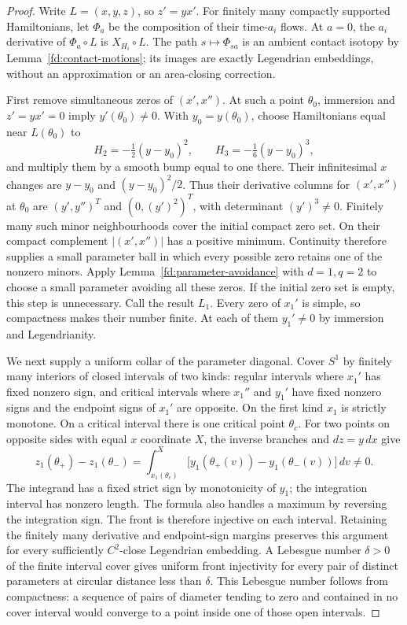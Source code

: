 \begin{proof}\leanok{}
Write $L=(x,y,z)$, so $z'=yx'$. For finitely many compactly supported
Hamiltonians, let $\Phi_a$ be the composition of their time-$a_i$ flows.
At $a=0$, the $a_i$ derivative of $\Phi_a\circ L$ is $X_{H_i}\circ L$.
The path $s\mapsto\Phi_{sa}$ is an ambient contact isotopy by
Lemma~\ref{fd:contact-motions}; its images are exactly Legendrian
embeddings, without an approximation or an area-closing correction.

First remove simultaneous zeros of $(x',x'')$. At such a point
$\theta_0$, immersion and $z'=yx'=0$ imply $y'(\theta_0)\ne0$.
With $y_0=y(\theta_0)$, choose Hamiltonians equal near $L(\theta_0)$ to
\begin{equation}
 H_2=-\tfrac12(y-y_0)^2,\qquad H_3=-\tfrac16(y-y_0)^3,
\end{equation}
and multiply them by a smooth bump equal to one there. Their
infinitesimal $x$ changes are $y-y_0$ and $(y-y_0)^2/2$.
Thus their derivative columns for $(x',x'')$ at $\theta_0$ are
$(y',y'')^T$ and $(0,(y')^2)^T$, with determinant $(y')^3\ne0$.
Finitely many such minor neighbourhoods cover the initial compact zero
set. On their compact complement $|(x',x'')|$ has a positive minimum.
Continuity therefore supplies a small parameter ball in which every
possible zero retains one of the nonzero minors. Apply
Lemma~\ref{fd:parameter-avoidance} with $d=1,q=2$ to choose a small
parameter avoiding all these zeros. If the initial zero set is empty,
this step is unnecessary. Call the result $L_1$.
Every zero of $x_1'$ is simple, so compactness makes their number finite.
At each of them $y_1'\ne0$ by immersion and Legendrianity.

We next supply a uniform collar of the parameter diagonal. Cover $S^1$
by finitely many interiors of closed intervals of two kinds: regular
intervals where $x_1'$ has fixed nonzero sign, and critical intervals
where $x_1''$ and $y_1'$ have fixed nonzero signs and the endpoint signs
of $x_1'$ are opposite. On the first kind $x_1$ is strictly monotone.
On a critical interval there is one critical point $\theta_c$.
For two points on opposite sides with equal $x$ coordinate $X$,
the inverse branches and $dz=y\,dx$ give
\begin{equation}
 z_1(\theta_+)-z_1(\theta_-)
 =\int_{x_1(\theta_c)}^X
     \bigl[y_1(\theta_+(v))-y_1(\theta_-(v))\bigr]\,dv\ne0.
\end{equation}
The integrand has a fixed strict sign by monotonicity of $y_1$;
the integration interval has nonzero length. The formula also handles
a maximum by reversing the integration sign. The front is therefore
injective on each interval. Retaining the finitely many derivative and
endpoint-sign margins preserves this argument for every sufficiently
$C^2$-close Legendrian embedding. A Lebesgue number $\delta>0$ of the
finite interval cover gives uniform front injectivity for every pair
of distinct parameters at circular distance less than $\delta$.
This Lebesgue number follows from compactness: a sequence of pairs of
diameter tending to zero and contained in no cover interval would
converge to a point inside one of those open intervals.


\end{proof}
